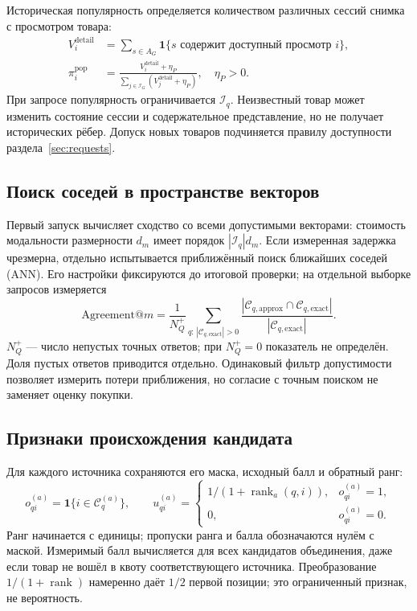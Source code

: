\documentclass[12pt,a4paper]{article}
\newcommand{\ind}{\mathbf 1}
\theoremstyle{plainru}
\begin{document}
Историческая популярность определяется количеством различных
сессий снимка с просмотром товара:
\begin{align}\label{eq:model-popularity}
V_i^{\mathrm{detail}}&=\sum_{s\in A_G}
\ind\{s\text{ содержит доступный просмотр }i\},\\
\pi_i^{\mathrm{pop}}&=\frac{V_i^{\mathrm{detail}}+\eta_P}
 {\sum_{j\in\mathcal I_G}(V_j^{\mathrm{detail}}+\eta_P)},
\quad\eta_P>0.
\nonumber\end{align}
При запросе популярность ограничивается $\mathcal I_q$.
Неизвестный товар может изменить состояние сессии и содержательное
представление, но не получает исторических рёбер. Допуск новых
товаров подчиняется правилу доступности раздела~\ref{sec:requests}.

\subsection{Поиск соседей в пространстве векторов}

Первый запуск вычисляет сходство со всеми допустимыми векторами:
стоимость модальности размерности $d_m$ имеет порядок $|\mathcal I_q|d_m$.
Если измеренная задержка чрезмерна, отдельно испытывается
приближённый поиск ближайших соседей (ANN).
Его настройки фиксируются до итоговой проверки; на отдельной выборке
запросов измеряется
\begin{equation}\label{eq:model-ann-agreement}
\mathrm{Agreement@}m=
\frac1{N_Q^+}\sum_{q:\,|\mathcal C_{q,\mathrm{exact}}|>0}
\frac{|\mathcal C_{q,\mathrm{approx}}\cap
\mathcal C_{q,\mathrm{exact}}|}
 {|\mathcal C_{q,\mathrm{exact}}|}.
\end{equation}
$N_Q^+$ --- число непустых точных ответов; при $N_Q^+=0$ показатель
не определён. Доля пустых ответов приводится отдельно.
Одинаковый фильтр допустимости позволяет измерить потери приближения,
но согласие с точным поиском не заменяет оценку покупки.

\subsection{Признаки происхождения кандидата}

Для каждого источника сохраняются его маска, исходный балл
и обратный ранг:
\begin{equation}\label{eq:model-source-rank}
o_{qi}^{(a)}=\ind\{i\in\mathcal C_q^{(a)}\},\qquad
u_{qi}^{(a)}=
\begin{cases}
1/(1+\operatorname{rank}_a(q,i)),&o_{qi}^{(a)}=1,\\
0,&o_{qi}^{(a)}=0.
\end{cases}
\end{equation}
Ранг начинается с единицы; пропуски ранга и балла обозначаются нулём
с маской. Измеримый балл вычисляется для всех кандидатов объединения,
даже если товар не вошёл в квоту соответствующего источника.
Преобразование $1/(1+\operatorname{rank})$ намеренно даёт $1/2$
первой позиции; это ограниченный признак, не вероятность.
\end{document}
